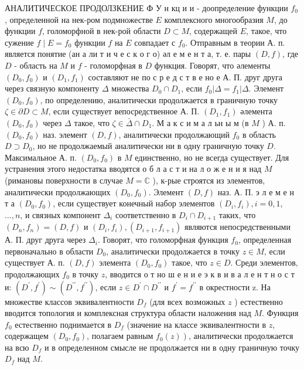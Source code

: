 \documentclass[10pt]{article}
\begin{document}
АНАЛИТИЧЕСКОЕ ПРОДОЛЗКЕНИЕ Ф У н кц и и - доопределение функции $f_{0}$, определенной на нек-ром подмножестве $E$ комплексного многообразия $M$, до функции $f$, голоморфной в нек-рой области $D \subset M$, содержащей $E$, такое, что сужение $f \mid E=f_{0}$ функции $f$ на $E$ совпадает с $f_{0}$. Отправным в теории А. п. является понятие (ан а ли т и ч е с к о г о) әл е м е н т а, т. е. пары $(D, f)$, где $D$ - область на $M$ и $f$ - голоморфная в $D$ функция. Говорят, что әлементы $\left(D_{0}, f_{0}\right)$ и $\left(D_{1}, f_{1}\right)$ составляют не по с р е д с т в е но е А. П. друг друга через связную компоненту $\Delta$ множества $D_{0} \cap D_{1}$, если $f_{0}\left|\Delta=f_{1}\right| \Delta$. Элемент $\left(D_{0}, f_{0}\right)$, по определению, аналитически продолжается в граничную точку $\zeta \in \partial D \subset M$, если существует вепосредственное А. П. $\left(D_{1}, f_{1}\right)$ әлемента $\left(D_{0}, f_{0}\right)$ через $\Delta$ такое, что $\zeta \in \bar{\Delta} \cap D_{1}$. М а к с и м а л ьн ы м (в $M$ ) А. п. $\left(D_{0}, f_{0}\right)$ наз. элемент $(D, f)$, аналитически продолжающий $f_{0}$ в область $D \supset D_{0}$, но не продолжаемый аналитически ни в одну граничную точку $D$. Максимальное А. п. $\left(D_{0}, f_{0}\right)$ в $M$ единственно, но не всегда существует. Для устранения этого недостатка вводятся о б л а с т и на л о ж е н и я над $M$ (римановы поверхности в случае $M=\mathbb{C}$ ), к-рые строятся из элементов, аналитически продолжающих $\left(D_{0}, f_{0}\right)$. Элемент $(D, f)$ наз. А. П. э л е м е н т а $\left(D_{0}, f_{0}\right)$, если существует конечный набор элементов $\left(D_{i}, f_{i}\right), i=0,1$, $\ldots, n$, и связных компонент $\Delta_{i}$ соответственно в $D_{i} \cap D_{i+1}$ таких, что $\left(D_{n}, f_{n}\right)=(D, f)$ и $\left(D_{i}, f_{i}\right),\left(D_{i+1}, f_{i+1}\right)$ являются непосредственными А. П. друг друга через $\Delta_{i}$. Говорят, что голоморфная функция $f_{0}$, определенная первоначально в области $D_{0}$, аналитически продолжается в точку $z \in M$, если существует А. п. $(D, f)$ элемента $\left(D_{0}, f_{0}\right)$ такое, что $z \in D$. Среди элементов, продолжающих $f_{0}$ в точку $z$, вводится о т но ш е н и е э к в и в а л е н т н о с т и: $\left(D^{\prime}, f^{\prime}\right) \sim\left(D^{\prime \prime}, f^{\prime \prime}\right)$, если $z \in D^{\prime} \cap D^{\prime \prime}$ и $f^{\prime}=f^{\prime \prime}$ в окрестности z. На множестве классов эквивалентности $D_{f}$ (для всех возможных $z$ ) естественно вводится топология и комплексная структура области наложения над $M$. Функция $f_{0}$ естественно поднимается в $D_{f}$ (значение на классе эквивалентности в $z$, содержащем $\left(D_{0}, f_{0}\right)$, полагаем равным $\left.f_{0}(z)\right)$, аналитически продолжается на всю $D_{f}$ и в определенном смысле не продолжается ни в одну граничную точку $D_{f}$ над $M$.
\end{document}

